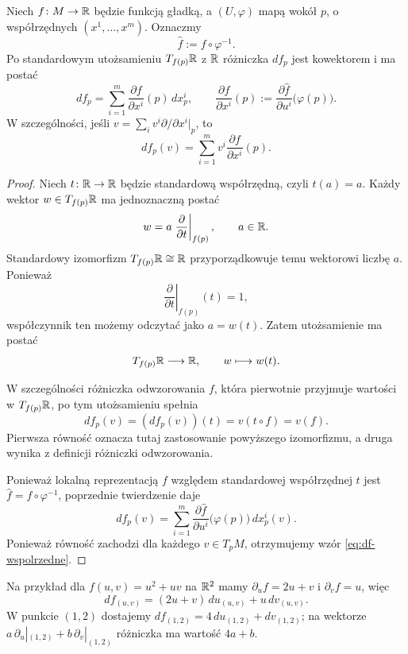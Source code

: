 \begin{wniosek}
\label{tw:rozniczka-funkcji-wspolrzedne}
Niech $f\colon M\to\mathbb{R}$ będzie funkcją gładką,
a $(U,\varphi)$ mapą wokół $p$, o współrzędnych
$(x^1,\ldots,x^m)$. Oznaczmy
\[
\widehat f:=f\circ\varphi^{-1}.
\]
Po standardowym utożsamieniu $T_{f(p)}\mathbb{R}$ z $\mathbb{R}$
różniczka $df_p$ jest kowektorem i ma postać
\begin{equation}
\label{eq:df-wspolrzedne}
df_p=\sum_{i=1}^m
\frac{\partial f}{\partial x^i}(p)\,dx_p^i,
\qquad
\frac{\partial f}{\partial x^i}(p)
:=
\frac{\partial\widehat f}{\partial u^i}
\bigl(\varphi(p)\bigr).
\end{equation}
W szczególności, jeśli
$v=\sum_i v^i\partial/\partial x^i|_p$, to
\[
df_p(v)=\sum_{i=1}^m
v^i\frac{\partial f}{\partial x^i}(p).
\]
\end{wniosek}

\begin{proof}
Niech $t\colon\mathbb{R}\to\mathbb{R}$ będzie standardową
współrzędną, czyli $t(a)=a$. Każdy wektor
$w\in T_{f(p)}\mathbb{R}$ ma jednoznaczną postać
\[
w=a\left.\frac{\partial}{\partial t}\right|_{f(p)},
\qquad a\in\mathbb{R}.
\]
Standardowy izomorfizm $T_{f(p)}\mathbb{R}\cong\mathbb{R}$
przyporządkowuje temu wektorowi liczbę $a$.
Ponieważ
\[
\left.\frac{\partial}{\partial t}\right|_{f(p)}(t)=1,
\]
współczynnik ten możemy odczytać jako $a=w(t)$.
Zatem utożsamienie ma postać
\[
T_{f(p)}\mathbb{R}\longrightarrow\mathbb{R},
\qquad w\longmapsto w(t).
\]

W szczególności różniczka odwzorowania
$f$, która pierwotnie przyjmuje wartości
w $T_{f(p)}\mathbb{R}$, po tym utożsamieniu spełnia
\[
df_p(v)=(df_p(v))(t)
=v(t\circ f)=v(f).
\]
Pierwsza równość oznacza tutaj zastosowanie
powyższego izomorfizmu, a druga wynika
z definicji różniczki odwzorowania.

Ponieważ lokalną reprezentacją $f$ względem
standardowej współrzędnej $t$ jest
$\widehat f=f\circ\varphi^{-1}$, poprzednie
twierdzenie daje
\[
df_p(v)=
\sum_{i=1}^m
\frac{\partial\widehat f}{\partial u^i}
\bigl(\varphi(p)\bigr)\,dx_p^i(v).
\]
Ponieważ równość zachodzi dla każdego
$v\in T_pM$, otrzymujemy wzór
\eqref{eq:df-wspolrzedne}.
\end{proof}

Na przykład dla $f(u,v)=u^2+uv$ na $\mathbb{R}^2$ mamy
$\partial_u f=2u+v$ i $\partial_v f=u$, więc
\[
 df_{(u,v)}=(2u+v)\,du_{(u,v)}+u\,dv_{(u,v)}.
\]
W punkcie $(1,2)$ dostajemy $df_{(1,2)}=4\,du_{(1,2)}+dv_{(1,2)}$;
na wektorze $a\,\partial_u|_{(1,2)}+b\,\partial_v|_{(1,2)}$
różniczka ma wartość $4a+b$.

